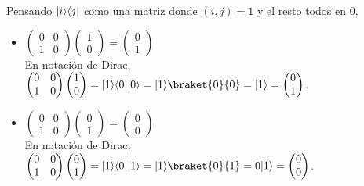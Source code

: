 \documentclass[osajnl,preprint,showpacs,superscriptaddress,10pt]{revtex4-1} %
\DeclarePairedDelimiter\bra{\langle}{\rvert}
\DeclarePairedDelimiter\ket{\lvert}{\rangle}
\begin{document}
Pensando $\ket{i}\bra{j}$ como una matriz donde $(i, j) = 1$ y el resto todos en 0,

\begin{itemize}
    \item $\begin{pmatrix}0 & 0 \\ 1 & 0\end{pmatrix}\begin{pmatrix}1 \\ 0\end{pmatrix} = \begin{pmatrix}0 \\ 1\end{pmatrix}$ \\
    
    En notación de Dirac, $\begin{pmatrix}0 & 0 \\ 1 & 0\end{pmatrix}\begin{pmatrix}1 \\ 0\end{pmatrix} = \ket{1}\bra{0}\ket{0} = \ket{1}\braket{0}{0} = \ket{1} = \begin{pmatrix}0 \\ 1\end{pmatrix}$.
    
    \item $\begin{pmatrix}0 & 0 \\ 1 & 0\end{pmatrix}\begin{pmatrix}0 \\ 1\end{pmatrix} = \begin{pmatrix}0 \\ 0\end{pmatrix}$ \\
    
    En notación de Dirac, $\begin{pmatrix}0 & 0 \\ 1 & 0\end{pmatrix}\begin{pmatrix}0 \\ 1\end{pmatrix} = \ket{1}\bra{0}\ket{1} = \ket{1}\braket{0}{1} = 0\ket{1} = \begin{pmatrix}0 \\ 0\end{pmatrix}$.
    

\end{itemize}
\end{document}
